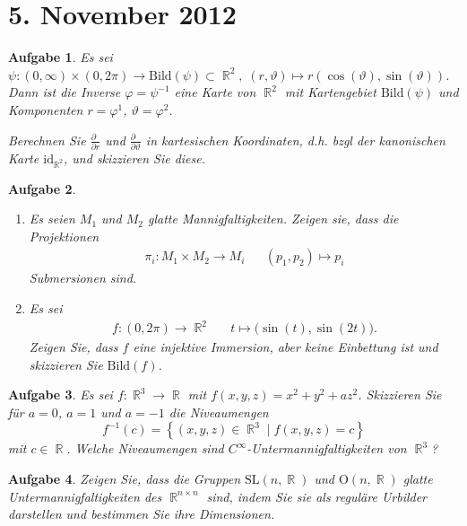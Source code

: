\documentclass[paper=A4, twoside, chapterprefix=true, bibliography=totoc, headsepline]{scrbook}
\let\temp\phi{}
\let\phi\varphi{}
\let\varphi\temp{}
\let\temp\theta{}
\let\theta\vartheta{}
\let\vartheta\temp{}
\let\temp\epsilon{}
\let\epsilon\varepsilon{}
\let\varepsilon\temp{}
\let\temp\rho{}
\let\rho\varrho{}
\let\varrho\temp{}
\DeclareMathOperator{\R}{\mathbb{R}}
\theoremstyle{plain}
\theoremstyle{nonumberplain}
\theoremstyle{empty}
\theoremstyle{break}
\newtheorem{Aufg}{Aufgabe}
\begin{document}

\section{5. November 2012}
\setcounter{Aufg}{0} %
\setcounter{Loes}{0}

\begin{Aufg}
Es sei $\psi: (0,\infty)\times (0,2\pi)\to \mathrm{Bild}(\psi)\subset \R^2, \;(r,\theta) \mapsto r (\cos(\theta),\sin(\theta))$. Dann ist die Inverse $\phi=\psi^{-1}$ eine Karte von $\R^2$ mit Kartengebiet $\mathrm{Bild}(\psi)$ und Komponenten $r=\phi^1$, $\theta=\phi^2$.

Berechnen Sie $\frac{\partial\phantom{r}}{\partial r}$ und $\frac{\partial \phantom{\theta}}{\partial \theta}$ in kartesischen Koordinaten, d.h. bzgl der kanonischen Karte $\mathrm{id}_{\R^2}$, und skizzieren Sie diese.
\end{Aufg}

\begin{Aufg}\begin{enumerate}[label=\alph*),leftmargin=*,widest=b]
\item
	Es seien $M_1$ und $M_2$ glatte Mannigfaltigkeiten. Zeigen sie, dass die Projektionen
	\begin{align*}
		\pi_i:M_1 \times M_2 \to M_i && (p_1,p_2)\mapsto p_i
	\end{align*}
	Submersionen sind.
\item
	Es sei
	\begin{align*}
		f:(0,2\pi) \to \R^2 && t \mapsto \big(\sin(t),\sin(2t)\big).
	\end{align*}
	Zeigen Sie, dass $f$ eine injektive Immersion, aber keine Einbettung ist und skizzieren Sie $\mathrm{Bild}(f)$.
\end{enumerate}\end{Aufg}

\begin{Aufg}
Es sei $f:\R^3 \to \R$ mit $f(x,y,z) = x^2 +y^2 +a z^2$. Skizzieren Sie für $a=0$, $a=1$ und $a=-1$ die Niveaumengen
	\[f^{-1}(c) =\left\{(x,y,z) \in \R^3 \mid f(x,y,z) =c\right\}\]
mit $c\in \R$. Welche Niveaumengen sind $C^\infty$-Untermannigfaltigkeiten von $\R^3$?
\end{Aufg}

\begin{Aufg}
Zeigen Sie, dass die Gruppen $\mathrm{SL}(n,\R)$ und $\mathrm{O}(n,\R)$ glatte Untermannigfaltigkeiten des $\R^{n\times n}$ sind, indem Sie sie als reguläre Urbilder darstellen und bestimmen Sie ihre Dimensionen.
\end{Aufg}
\end{document}
